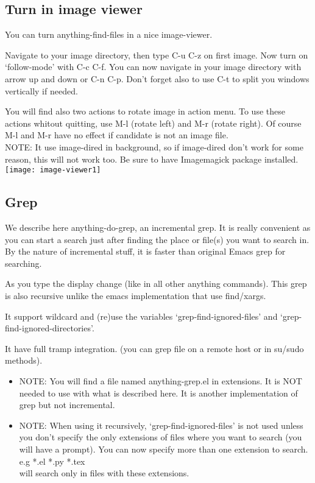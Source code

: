 \documentclass[a4paper,11pt]{article}
\begin{document}
\subsection{Turn in image viewer}
\label{sec:turn-image-viewer}
You can turn anything-find-files in a nice image-viewer.

Navigate to your image directory, then type C-u C-z on first image.
Now turn on `follow-mode' with C-c C-f.
You can now navigate in your image directory with arrow up and down or C-n C-p.
Don't forget also to use C-t to split you windows vertically if needed.

You will find also two actions to rotate image in action menu. 
To use these actions whitout quitting, use M-l (rotate left) and M-r (rotate right).
Of course M-l and M-r have no effect if candidate is not an image file.\\

NOTE:
It use image-dired in background, so if image-dired don't work for some reason, this will
not work too.
Be sure to have Imagemagick package installed.\\

\texttt{[image: image-viewer1]}
\newpage
\subsection{Grep}
\label{sec:grep}
We describe here anything-do-grep, an incremental grep.
It is really convenient as you can start a search just after finding the place or file(s) you want to search in.
By the nature of incremental stuff, it is faster than original Emacs grep for searching.

As you type the display change (like in all other anything commands).
This grep is also recursive unlike the emacs implementation that use find/xargs.

It support wildcard and (re)use the variables `grep-find-ignored-files'
and `grep-find-ignored-directories'.

It have full tramp integration.
(you can grep file on a remote host or in su/sudo methods).

\begin{itemize}
\item NOTE: 
You will find a file named anything-grep.el in extensions.
It is NOT needed to use with what is described here.
It is another implementation of grep but not incremental.
\end{itemize}


\begin{itemize}
\item NOTE:
When using it recursively, `grep-find-ignored-files' is not used unless you don't specify
the only extensions of files where you want to search (you will have a prompt).
You can now specify more than one extension to search.\\
e.g *.el *.py *.tex \\
will search only in files with these extensions.
\end{itemize}
\end{document}
